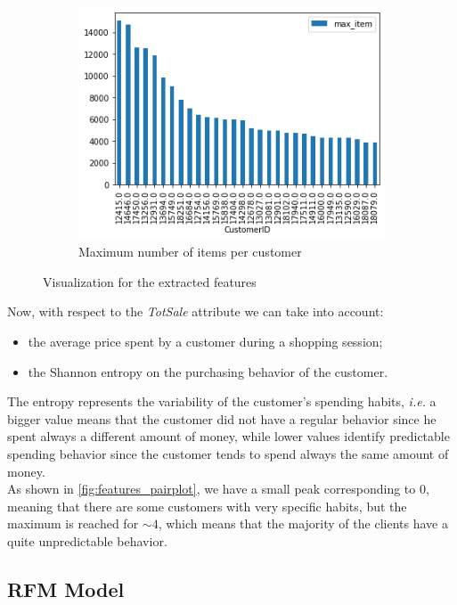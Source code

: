 \begin{figure}[h!]
\begin{subfigure}{.3\textwidth}
\centering
\includegraphics[width=\textwidth]{img/preparation/max_item.png}
\caption{Maximum number of items per customer}
\label{fig:max_item}
\end{subfigure}
\caption{Visualization for the extracted features}
\label{fig:qta_features}
\end{figure}

Now, with respect to the \emph{TotSale} attribute we can take into account:
\begin{itemize}
\item the average price spent by a customer during a shopping session;
\item the Shannon entropy on the purchasing behavior of the customer.
\end{itemize}

The entropy represents the variability of the customer's spending habits, \emph{i.e.} a bigger value means that the customer did not have a regular behavior since he spent always a different amount of money, while lower values identify predictable spending behavior since the customer tends to spend always the same amount of money.\\
As shown in \ref{fig:features_pairplot}, we have a small peak corresponding to 0, meaning that there are some customers with very specific habits, but the maximum is reached for $\sim 4$, which means that the majority of the clients have a quite unpredictable behavior.

\subsection{RFM Model}

